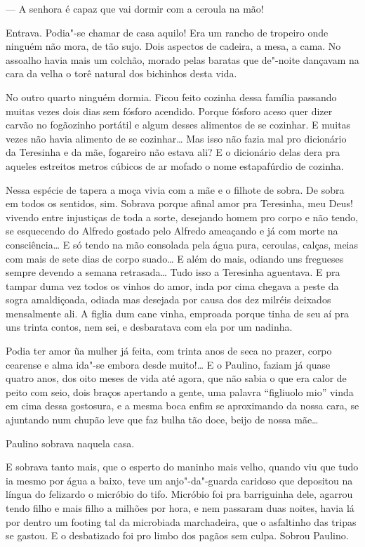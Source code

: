 --- A senhora é capaz que vai dormir com a ceroula na mão!

Entrava. Podia"-se chamar de casa aquilo! Era um rancho de tropeiro onde
ninguém não mora, de tão sujo. Dois aspectos de cadeira, a mesa, a cama.
No assoalho havia mais um colchão, morado pelas baratas que de"-noite
dançavam na cara da velha o torê natural dos bichinhos desta vida.

No outro quarto ninguém dormia. Ficou feito cozinha dessa família
passando muitas vezes dois dias sem fósforo acendido. Porque fósforo
aceso quer dizer carvão no fogãozinho portátil e algum desses alimentos
de se cozinhar. E muitas vezes não havia alimento de se cozinhar\ldots{} Mas
isso não fazia mal pro dicionário da Teresinha e da mãe, fogareiro não
estava ali? E o dicionário delas dera pra aqueles estreitos metros
cúbicos de ar mofado o nome estapafúrdio de cozinha.

Nessa espécie de tapera a moça vivia com a mãe e o filhote de sobra. De
sobra em todos os sentidos, sim. Sobrava porque afinal amor pra
Teresinha, meu Deus! vivendo entre injustiças de toda a sorte, desejando
homem pro corpo e não tendo, se esquecendo do Alfredo gostado pelo
Alfredo ameaçando e já com morte na consciência\ldots{} E só tendo na mão
consolada pela água pura, ceroulas, calças, meias com mais de sete dias
de corpo suado\ldots{} E além do mais, odiando uns fregueses sempre devendo a
semana retrasada\ldots{} Tudo isso a Teresinha aguentava. E pra tampar duma
vez todos os vinhos do amor, inda por cima chegava a peste da sogra
amaldiçoada, odiada mas desejada por causa dos dez milréis deixados
mensalmente ali. A figlia dum cane vinha, emproada porque tinha de seu
aí pra uns trinta contos, nem sei, e desbaratava com ela por um
nadinha. 

Podia ter amor ũa mulher já feita, com trinta anos de seca no prazer,
corpo cearense e alma ida"-se embora desde muito!\ldots{} E o Paulino, faziam
já quase quatro anos, dos oito meses de vida até agora, que não sabia o
que era calor de peito com seio, dois braços apertando a gente, uma
palavra ``figliuolo mio'' vinda em cima dessa gostosura, e a mesma boca
enfim se aproximando da nossa cara, se ajuntando num chupão leve que faz
bulha tão doce, beijo de nossa mãe\ldots{}

Paulino sobrava naquela casa.

E sobrava tanto mais, que o esperto do maninho mais velho, quando viu
que tudo ia mesmo por água a baixo, teve um anjo"-da"-guarda caridoso que
depositou na língua do felizardo o micróbio do tifo. Micróbio foi pra
barriguinha dele, agarrou tendo filho e mais filho a milhões por hora, e
nem passaram duas noites, havia lá por dentro um footing tal da
microbiada marchadeira, que o asfaltinho das tripas se gastou. E o
desbatizado foi pro limbo dos pagãos sem culpa. Sobrou Paulino.


